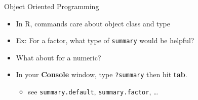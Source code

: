 \documentclass[
  ignorenonframetext,
]{beamer}
\newenvironment{Shaded}{\begin{snugshade}}{\end{snugshade}}
\newcommand{\DecValTok}[1]{\textcolor[rgb]{0.00,0.00,0.81}{#1}}
\newcommand{\FloatTok}[1]{\textcolor[rgb]{0.00,0.00,0.81}{#1}}
\newcommand{\FunctionTok}[1]{\textcolor[rgb]{0.00,0.00,0.00}{#1}}
\newcommand{\NormalTok}[1]{#1}
\newcommand{\SpecialCharTok}[1]{\textcolor[rgb]{0.00,0.00,0.00}{#1}}
\providecommand{\tightlist}{%
  \setlength{\itemsep}{0pt}\setlength{\parskip}{0pt}}
\begin{document}
\begin{frame}[fragile]{Object Oriented Programming}
\protect\hypertarget{object-oriented-programming}{}
\begin{itemize}[<+->]
\tightlist
\item
  In R, commands care about object class and type
\item
  Ex: For a factor, what type of \texttt{summary} would be helpful?
\end{itemize}

\begin{Shaded}
\end{Shaded}

\begin{itemize}[<+->]
\tightlist
\item
  What about for a numeric?
\end{itemize}

\begin{Shaded}
\end{Shaded}

\begin{itemize}[<+->]
\tightlist
\item
  In your \textbf{Console} window, type \texttt{?summary} then hit
  \textbf{tab}.

  \begin{itemize}[<+->]
  \tightlist
  \item
    see \texttt{summary.default}, \texttt{summary.factor}, \ldots{}
  \end{itemize}
\end{itemize}
\end{frame}
\end{document}
